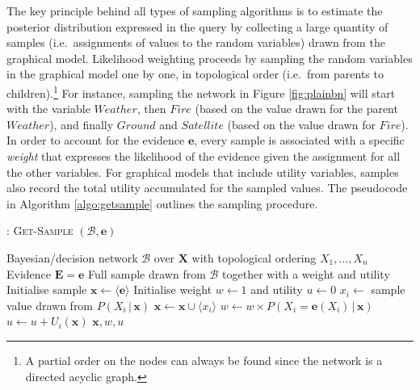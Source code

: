 The key principle behind all types of sampling algorithms is to estimate the posterior distribution expressed in the query by collecting a large quantity of samples (i.e.\ assignments of values to the random variables) drawn from the graphical model.  Likelihood weighting proceeds by sampling the random variables in the graphical model one by one, in topological order (i.e.\ from parents to children).\footnote{A partial order on the nodes  can always be found since the network is a directed acyclic graph.} For instance, sampling the network in Figure \ref{fig:plainbn} will start with the variable $\mathit{Weather}$, then $\mathit{Fire}$ (based on the value drawn for the parent $\mathit{Weather}$), and finally $\mathit{Ground}$ and $\mathit{Satellite}$ (based on the value drawn for $\mathit{Fire}$).  In order to account for the evidence $\mathbf{e}$, every sample is associated with a specific \textit{weight} that expresses the likelihood of the evidence given the assignment for all the other variables.  For graphical models that include utility variables, samples also record the total utility accumulated for the sampled values. The pseudocode in Algorithm \ref{algo:getsample} outlines the sampling procedure.  

\begin{algorithm}[h!]
\caption{: \textsc{Get-Sample} $(\mathcal{B}, \mathbf{e})$}
\begin{algorithmic}[1] \vspace{2mm} 
\REQUIRE Bayesian/decision network $\mathcal{B}$ over $\mathbf{X}$ with topological ordering $X_1, \dots, X_n$
\REQUIRE Evidence $\mathbf{E} =\mathbf{e}$
\ENSURE Full sample drawn from $\mathcal{B}$ together with a weight and utility \\[2mm]
\STATE Initialise sample $\mathbf{x} \leftarrow \langle \mathbf{e} \rangle$
\STATE Initialise weight $w \leftarrow 1$ and utility $u \leftarrow 0$
\STATE $x_i \leftarrow$ sample value drawn from $P(X_i  \, | \,  \mathbf{x})$
\STATE $\mathbf{x} \leftarrow \mathbf{x} \cup \langle x_i \rangle$
\STATE $w \leftarrow w \times P\left(X_i = \mathbf{e}(X_i)  \, | \,  \mathbf{x}\right)$
\STATE $u \leftarrow u + U_i(\mathbf{x})$
\ENDIF
\ENDFOR
\RETURN $\mathbf{x}, w, u$
\end{algorithmic}
\label{algo:getsample}
\end{algorithm}

